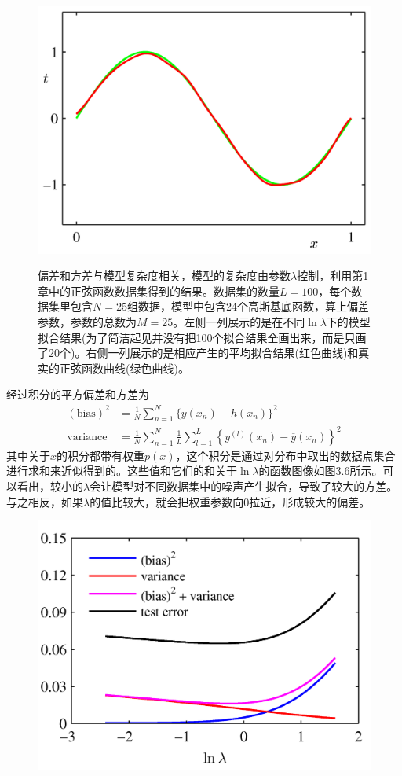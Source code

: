 \documentclass[b5paper]{book}
\numberwithin{equation}{chapter}
\begin{document}
{\begin{figure}[H]
\begin{minipage}[t]{0.5\linewidth}
		\includegraphics[scale=0.8]{Images/3-5f.png}
		\label{fig:3-5f}
		\end{minipage}
		\caption{偏差和方差与模型复杂度相关，模型的复杂度由参数$\lambda$控制，利用第1章中的正弦函数数据集得到的结果。数据集的数量$L=100$，每个数据集里包含$N=25$组数据，模型中包含24个高斯基底函数，算上偏差参数，参数的总数为$M=25$。左侧一列展示的是在不同$\ln \lambda$下的模型拟合结果(为了简洁起见并没有把100个拟合结果全画出来，而是只画了20个)。右侧一列展示的是相应产生的平均拟合结果(红色曲线)和真实的正弦函数曲线(绿色曲线)。}
	\end{figure}
	经过积分的平方偏差和方差为
	\begin{align}
		\mathrm{(bias)}^2 &= \frac{1}{N} \sum_{n=1}^N \{\overline{y}(x_n) - h(x_n)\}^2 \\
		\mathrm{variance} &= \frac{1}{N} \sum_{n=1}^N \frac{1}{L} \sum_{l=1}^L \left\{y^{(l)}(x_n) - \overline{y}(x_n)\right\}^2
	\end{align}
	其中关于$x$的积分都带有权重$p(x)$，这个积分是通过对分布中取出的数据点集合进行求和来近似得到的。这些值和它们的和关于$\ln \lambda$的函数图像如图3.6所示。可以看出，较小的$\lambda$会让模型对不同数据集中的噪声产生拟合，导致了较大的方差。与之相反，如果$\lambda$的值比较大，就会把权重参数向0拉近，形成较大的偏差。
	\begin{figure}[ht]
		\centering
		\includegraphics[scale=0.8]{Images/3-6.png}

\end{figure}}
\end{document}

